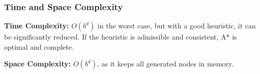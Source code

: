 \subsubsection{Time and Space Complexity}
\textbf{Time Complexity:} \( O(b^d) \) in the worst case, but with a good heuristic, it can be significantly reduced. If the heuristic is admissible and consistent, A* is optimal and complete.

\textbf{Space Complexity:} \( O(b^d) \), as it keeps all generated nodes in memory.